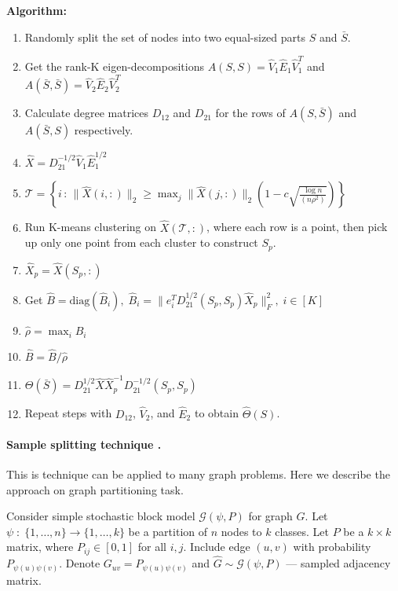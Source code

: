 \documentclass{ITaSconf}
\begin{document}
	\textbf{Algorithm:}
	\begin{enumerate}
		\item Randomly split the set of nodes into two equal-sized parts $S$ and $\bar{S}$.
		\item Get the rank-K eigen-decompositions $A(S, S) = \hat V_1 \hat E_1 \hat V_1^T$ and $A(\bar{S}, \bar{S}) = \hat V_2 \hat E_2 \hat V_2^T$ 
		\item Calculate degree matrices $D_{12}$ and $D_{21}$ for the rows of $A(S, \bar S)$ and $A(\bar S, S)$ respectively.
		\item $\hat X = D_{21}^{-1/2} \hat V_1 \hat E_1^{1/2}$
		\item $ \mathcal{T} =  \left\{ i\,:\, \lVert \hat X(i,:)\rVert_2 \ge \max_j \lVert \hat X(j,:)\rVert_2 \left( 1 - c \sqrt{\frac{\log n}{(n \rho^2)}} \right) \right\}$
		\item Run K-means clustering on $\hat X(\mathcal{T} , :)$, where each row is a point, then pick up only one point from each cluster to construct $S_p$.
		\item $\hat X_p = \hat X (S_p, :)$
		\item Get $\hat B = \mathrm{diag}(\hat B_i), \; \hat B_i = \lVert e^T_i D_{21}^{1/2}(S_p, S_p) \hat X_p \rVert^2_F, \; i \in [K]$
		\item $\hat \rho = \max_i \hat B_i$
		\item $\hat B = \hat B / \hat \rho$
		\item $\Theta(\bar S) = D_{21}^{1/2} \hat X \hat X_p^{-1} D_{21}^{-1/2}(S_p, S_p)$
		\item Repeat steps with $D_{12}$, $\hat V_2$, and $\hat E_2$ to obtain $\hat \Theta(S)$.
		
	\end{enumerate}
	
	\paragraph{Sample splitting technique \cite{mcsherry2001spectral}.}
	
	This is technique can be applied to many graph problems. Here we describe the approach on graph partitioning task.
	
	Consider simple stochastic block model $\mathcal{G}(\psi, P)$ for graph $G$. Let $ \psi \; : \; \{1, \dots, n\} \rightarrow\{1,\dots,k\} $ be a partition of $n$ nodes to $k$ classes. Let $P$ be a $k\times k$ matrix, where $P_{ij} \in [0,1]$ for all $i,j$. Include edge $(u,v)$ with probability $P_{\psi(u)\psi(v)}$. Denote $G_{uv} = P_{\psi(u)\psi(v)}$ and $\hat G \sim \mathcal{G}(\psi, P)$ --- sampled adjacency matrix.
	
\end{document}
